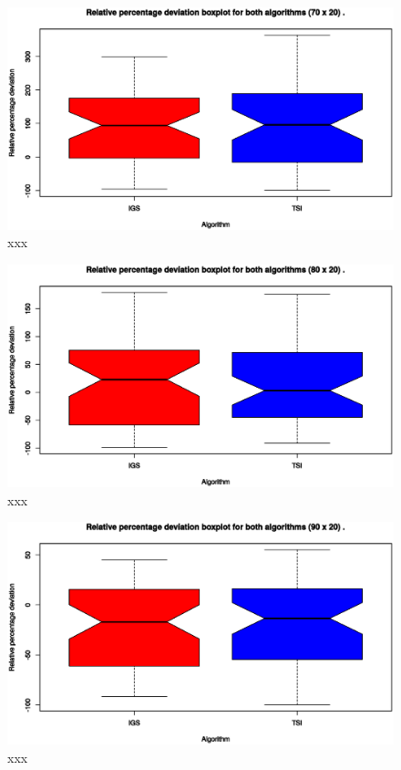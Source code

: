 \begin{figure}[H]
	\centering
	\includegraphics[width=\textwidth]{fig/box/70x20}
	\caption{xxx}
\end{figure}

\begin{figure}[H]
	\centering
	\includegraphics[width=\textwidth]{fig/box/80x20}
	\caption{xxx}
\end{figure}

\begin{figure}[H]
	\centering
	\includegraphics[width=\textwidth]{fig/box/90x20}
	\caption{xxx}
\end{figure}